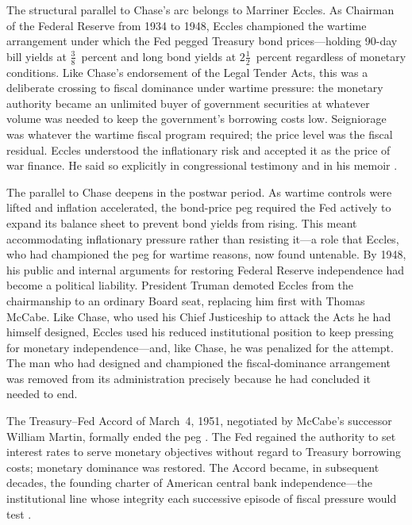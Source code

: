 \documentclass[12pt]{article}
\begin{document}
The structural parallel to Chase's arc
belongs to Marriner Eccles.  As Chairman of the Federal Reserve from 1934
to 1948, Eccles championed the wartime arrangement under which the Fed
pegged Treasury bond prices---holding 90-day bill yields at
$\tfrac{3}{8}$~percent and long bond yields at $2\tfrac{1}{2}$~percent
regardless of monetary conditions.  Like Chase's endorsement of the Legal
Tender Acts, this was a deliberate crossing to fiscal dominance under
wartime pressure: the monetary authority became an unlimited buyer of
government securities at whatever volume was needed to keep the
government's borrowing costs low.  Seigniorage was whatever the wartime
fiscal program required; the price level was the fiscal residual.  Eccles
understood the inflationary risk and accepted it as the price of war
finance.  He said so explicitly in congressional testimony and in his
memoir \citep{Eccles1951}.

The parallel to Chase deepens in the postwar period.  As wartime controls
were lifted and inflation accelerated, the bond-price peg required the
Fed actively to expand its balance sheet to prevent bond yields from
rising.  This meant accommodating inflationary pressure rather than
resisting it---a role that Eccles, who had championed the peg for wartime
reasons, now found untenable.  By 1948, his public and internal arguments
for restoring Federal Reserve independence had become a political
liability.  President Truman demoted Eccles from the chairmanship to an
ordinary Board seat, replacing him first with Thomas McCabe.  Like Chase,
who used his Chief Justiceship to attack the Acts he had himself designed,
Eccles used his reduced institutional position to keep pressing for
monetary independence---and, like Chase, he was penalized for the attempt.
The man who had designed and championed the fiscal-dominance arrangement
was removed from its administration precisely because he had concluded it
needed to end.

The Treasury--Fed Accord of March~4, 1951, negotiated by McCabe's
successor William Martin, formally ended the peg \citep{HetzelLeach2001}.
The Fed regained the authority to set interest rates to serve monetary
objectives without regard to Treasury borrowing costs; monetary dominance
was restored.  The Accord became, in subsequent decades, the founding
charter of American central bank independence---the institutional line
whose integrity each successive episode of fiscal pressure would test
\citep{Meltzer2003}.
\end{document}
